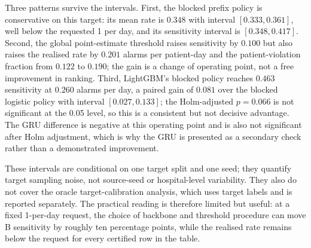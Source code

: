 Three patterns survive the intervals. First, the blocked prefix policy is conservative on this target: its mean rate is $0.348$ with interval $[0.333,0.361]$, well below the requested 1 per day, and its sensitivity interval is $[0.348,0.417]$. Second, the global point-estimate threshold raises sensitivity by $0.100$ but also raises the realised rate by $0.201$ alarms per patient-day and the patient-violation fraction from $0.122$ to $0.190$; the gain is a change of operating point, not a free improvement in ranking. Third, LightGBM's blocked policy reaches $0.463$ sensitivity at $0.260$ alarms per day, a paired gain of $0.081$ over the blocked logistic policy with interval $[0.027,0.133]$; the Holm-adjusted $p=0.066$ is not significant at the 0.05 level, so this is a consistent but not decisive advantage. The GRU difference is negative at this operating point and is also not significant after Holm adjustment, which is why the GRU is presented as a secondary check rather than a demonstrated improvement.

These intervals are conditional on one target split and one seed; they quantify target sampling noise, not source-seed or hospital-level variability. They also do not cover the oracle target-calibration analysis, which uses target labels and is reported separately. The practical reading is therefore limited but useful: at a fixed 1-per-day request, the choice of backbone and threshold procedure can move B sensitivity by roughly ten percentage points, while the realised rate remains below the request for every certified row in the table.
